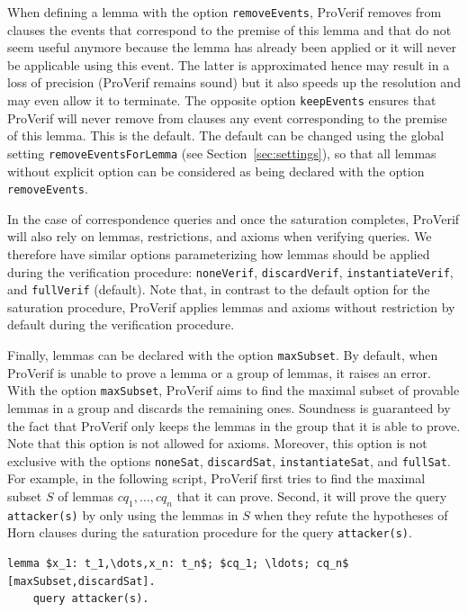 \documentclass{book}
\begin{document}
When defining a lemma with the option \lstinline!removeEvents!, ProVerif removes from clauses the events that correspond to the premise of this lemma and that do not seem useful anymore because the lemma has already been applied or it will never be applicable using this event. The latter is approximated hence may result in a loss of precision (ProVerif remains sound) but it also speeds up the resolution and may even allow it to terminate.
The opposite option \lstinline!keepEvents! ensures that ProVerif will never remove from clauses any event corresponding to the premise of this lemma. This is the default. The default can be changed using the global setting \lstinline!removeEventsForLemma! (see Section~\ref{sec:settings}), so that all lemmas without explicit option can be considered as being declared with the option \lstinline!removeEvents!.

In the case of correspondence queries and once the saturation completes, ProVerif will also rely on lemmas, restrictions, and axioms when verifying queries. We therefore have similar options parameterizing how lemmas should be applied during the verification procedure: \lstinline!noneVerif!, \lstinline!discardVerif!, \lstinline!instantiateVerif!, and \lstinline!fullVerif! (default). Note that, in contrast to the default option for the saturation procedure, ProVerif applies lemmas and axioms without restriction by default during the verification procedure.

Finally, lemmas can be declared with the option \lstinline!maxSubset!. By default, when ProVerif is unable to prove a lemma or a group of lemmas, it raises an error. With the option \lstinline!maxSubset!, ProVerif aims to find the maximal subset of provable lemmas in a group and discards the remaining ones. Soundness is guaranteed by the fact that ProVerif only keeps the lemmas in the group that it is able to prove. Note that this option is not allowed for axioms. Moreover, this option is not exclusive with the options \lstinline!noneSat!, \lstinline!discardSat!, \lstinline!instantiateSat!, and \lstinline!fullSat!. For example, in the following script, ProVerif first tries to find the maximal subset $S$ of lemmas $cq_1,\ldots, cq_n$ that it can prove. Second, it will prove the query \lstinline!attacker(s)! by only using the lemmas in $S$ when they refute the hypotheses of Horn clauses during the saturation procedure for the query \lstinline!attacker(s)!.
\begin{lstlisting}[numbers=none]
	lemma $x_1: t_1,\dots,x_n: t_n$; $cq_1; \ldots; cq_n$ [maxSubset,discardSat].
	query attacker(s).
\end{lstlisting}
\end{document}
